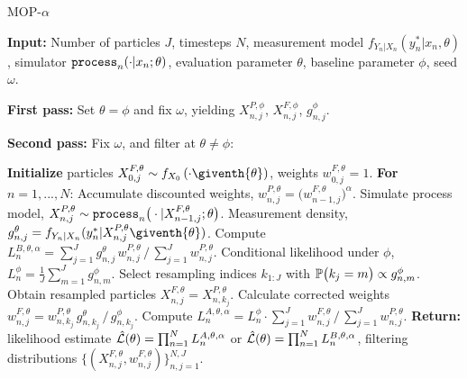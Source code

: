 \documentclass[numsec,webpdf,modern,medium,namedate]{oup-authoring-template}
\theoremstyle{thmstyleone}%
\theoremstyle{thmstyletwo}%
\theoremstyle{thmstylethree}%
\begin{document}
\begin{algorithm}[htbp!]
	\caption{MOP-$\alpha$}
    \label{alg:mop}
	     \textbf{Input:} Number of particles $J$, timesteps $N$, measurement model $f_{Y_n|X_n}(y_n^*|x_n, \theta)$, simulator $\texttt{process}_n(\cdot|x_n; \theta)$, evaluation parameter $\theta$, baseline parameter $\phi$, seed $\omega$.
      
        \textbf{First pass:} Set $\theta=\phi$ and fix $\omega$, yielding $X_{n,j}^{P,\phi}$, $X_{n,j}^{F,\phi}$, $g^{\phi}_{n,j}$.
            
        \textbf{Second pass:}
        Fix $\omega$, and filter at $\theta\neq \phi$:
            
		\textbf{Initialize } particles ${X}_{0,j}^{F,\theta}\sim {f}_{{X}_{0}}\left(\cdot\giventh{\theta}\right)$, weights $w^{F,\theta}_{0,j}= 1$. \newline
		\textbf{For} $n=1,...,N$: \newline
            \hspace*{4mm} Accumulate discounted weights, $w_{n,j}^{P,\theta} = \big(w_{n-1,j}^{F,\theta}\big)^\alpha$.\newline
            \hspace*{4mm} Simulate process model,
            ${X}_{n,j}^{P,\theta}\sim \texttt{process}_n\big(\cdot|{X}_{n-1,j}^{F, \theta};{\theta}\big)$. \newline
            \hspace*{4mm} Measurement density,
            $g^{\theta}_{n,j}={f}_{{Y}_{n}|{X}_{n}}(y_{n}^{*}|{X}_{n,j}^{P,\theta}\giventh{\theta})$. \newline
            \hspace*{4mm} Compute $L_n^{B,\theta,\alpha} ={\sum_{j=1}^Jg^\theta_{n,j} \, w^{P,\theta}_{n,j}}\, \big/\, {\sum_{j=1}^J  w^{P,\theta}_{n,j}}$. \newline
            \hspace*{4mm} Conditional likelihood under $\phi$,
            $L_n^{\phi} = \frac{1}{J}\sum_{m=1}^{J}g^{\phi}_{n,m}$.\newline
            \hspace*{4mm} Select resampling indices $k_{1:J}$ with $\mathbb{P}\big(k_{j}=m\big) \propto g^{\phi}_{n,m}$. \newline
            \hspace*{4mm} Obtain resampled particles ${X}_{n,j}^{F,\theta}={X}_{n,k_{j}}^{P,\theta}$. \newline
            \hspace*{4mm} Calculate corrected weights
            $w_{n,j}^{F,\theta}= w^{P,\theta}_{n,k_j} \, g^{\theta}_{n,k_j} \, \big/ \, { g^{\phi}_{n,k_j}}$.\newline
            \hspace*{4mm} Compute $ L_n^{A,\theta,\alpha} = L_n^\phi\cdot {\sum_{j=1}^J w^{F,\theta}_{n,j}} \, \big/ \, {\sum_{j=1}^J  w^{P,\theta}_{n,j}}$.\newline
		\textbf{Return:} likelihood estimate $\hat{\mathcal{L}}(\theta) = \prod_{n=1}^N L_n^{A,\theta,\alpha}$ or $\hat{\mathcal{L}}(\theta) = \prod_{n=1}^N L_n^{B,\theta,\alpha}$, filtering distributions $\{(X_{n,j}^{F, \theta}, w^{F,\theta}_{n,j})\}_{n,j=1}^{N,J}.$
\end{algorithm}
\end{document}
